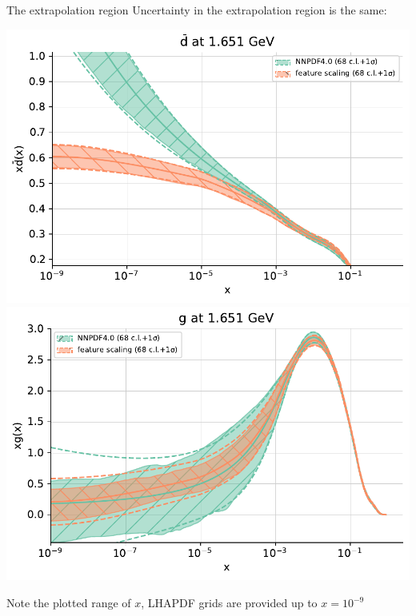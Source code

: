\documentclass[aspectratio=169,11pt]{beamer}
\begin{document}
\begin{frame}[t]{The extrapolation region}
  Uncertainty in the extrapolation region is the same:\\
  \begin{center}
    \includegraphics[height=0.5\textheight]{figures/pdf_extra_dbar_feature_vs_nnpdf40.pdf}
    \includegraphics[height=0.5\textheight]{figures/pdf_extra_g_feature_vs_nnpdf40.pdf}
  \end{center}
  Note the plotted range of $x$, LHAPDF grids are provided up to $x=10^{-9}$
\end{frame}
\end{document}

